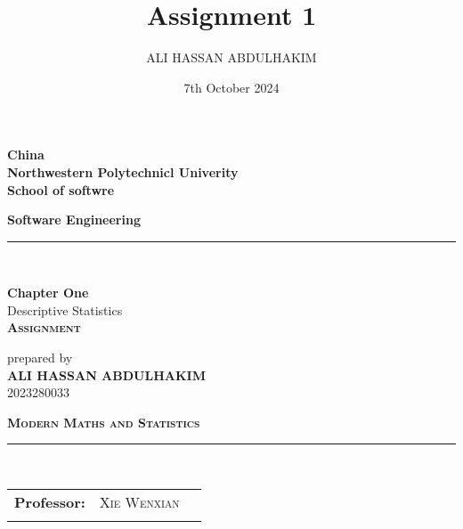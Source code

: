 \documentclass{article}
\title{Assignment 1}
\author{ALI HASSAN ABDULHAKIM }
\date{7th October 2024}
\begin{document}
\begin{titlepage}
    \newcommand{\HRule}{\rule{\linewidth}{0.35mm}} %
    \begin{flushleft}
        {\scriptsize
        \textbf{\large{China}}\\
        \textbf{\large{Northwestern Polytechnicl Univerity}}\\
        \textbf{\large{School of softwre }}\\

        \textbf{\large{Software Engineering}}}
    \end{flushleft}
    \HRule \\[0.3cm]
    \begin{center}
        \textbf{\textbf{\huge{Chapter One}}}\\
        Descriptive Statistics\\
        \textbf{\textsc{\large{Assignment }}}\\
    \end{center}
    \begin{center}
        prepared by\\
        \textbf{{\large ALI HASSAN ABDULHAKIM}}\\
        \textsc{{\large 2023280033}}\\
    \end{center}
    \begin{center}
        \textbf{\textsc{\huge{ Modern Maths and  Statistics}}}\\

        \HRule \\
    \end{center}

    \begin{center}
        \begin{tabular}{lll}
            \textbf{Professor:}  & \textsc{Xie Wenxian} 
            \tabularnewline
            \tabularnewline
        \end{tabular}
    \end{center}
    \sloppy
\end{titlepage}
\end{document}
